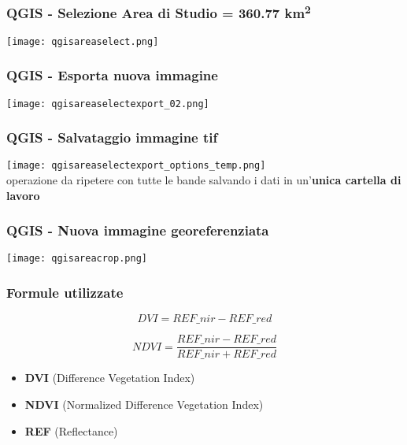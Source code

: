 \documentclass{beamer}
\begin{document}
\begin{frame}
\frametitle{QGIS - Selezione Area di Studio = 360.77 km\textsuperscript{2}}
\centering
\texttt{[image: qgisareaselect.png]}
\end{frame}

\begin{frame}
\frametitle{QGIS - Esporta nuova immagine}
\centering
\texttt{[image: qgisareaselectexport\_02.png]}
\end{frame}

\begin{frame}
\frametitle{QGIS - Salvataggio immagine tif}
\centering
\texttt{[image: qgisareaselectexport\_options\_temp.png]} \\
operazione da ripetere con tutte le bande salvando i dati in un'\textbf{unica cartella di lavoro}
\end{frame}

\begin{frame}
\frametitle{QGIS - Nuova immagine georeferenziata}
\centering
\texttt{[image: qgisareacrop.png]}
\end{frame}

\begin{frame}
\frametitle{Formule utilizzate}
\begin{equation}
 DVI = {REF\_nir -  REF\_red} 
 \end{equation}
 
 \begin{equation}
 NDVI = \frac{REF\_nir - REF\_red}{REF\_nir + REF\_red}
\end{equation}
\begin{itemize}
\item \textbf{DVI} (Difference Vegetation Index)
\item \textbf{NDVI} (Normalized Difference Vegetation Index)
\item \textbf{REF} (Reflectance)
\end{itemize}
\end{frame}


\end{document}
